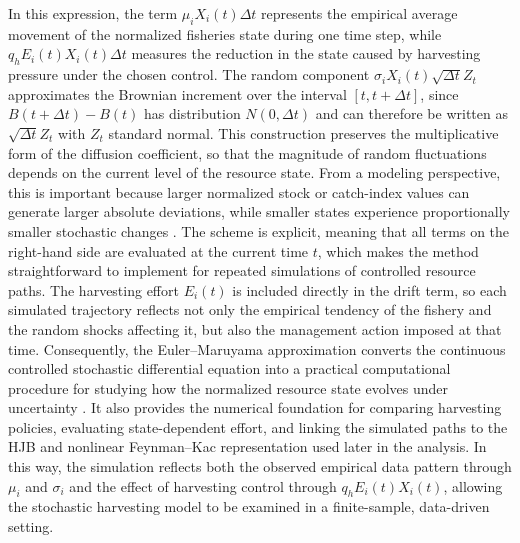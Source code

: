 \documentclass[11pt]{article}
\begin{document}
	In this expression, the term $\mu_iX_i(t)\Delta t$ represents the empirical average movement of the normalized fisheries state during one time step, while $q_hE_i(t)X_i(t)\Delta t$ measures the reduction in the state caused by harvesting pressure under the chosen control. The random component $\sigma_iX_i(t)\sqrt{\Delta t}Z_t$ approximates the Brownian increment over the interval $[t,t+\Delta t]$, since $B(t+\Delta t)-B(t)$ has distribution $N(0,\Delta t)$ and can therefore be written as $\sqrt{\Delta t}Z_t$ with $Z_t$ standard normal. This construction preserves the multiplicative form of the diffusion coefficient, so that the magnitude of random fluctuations depends on the current level of the resource state. From a modeling perspective, this is important because larger normalized stock or catch-index values can generate larger absolute deviations, while smaller states experience proportionally smaller stochastic changes \citep{khan2023myb}. The scheme is explicit, meaning that all terms on the right-hand side are evaluated at the current time $t$, which makes the method straightforward to implement for repeated simulations of controlled resource paths. The harvesting effort $E_i(t)$ is included directly in the drift term, so each simulated trajectory reflects not only the empirical tendency of the fishery and the random shocks affecting it, but also the management action imposed at that time. Consequently, the Euler--Maruyama approximation converts the continuous controlled stochastic differential equation into a practical computational procedure for studying how the normalized resource state evolves under uncertainty \citep{gaudet2011risk,anderson2026obesity}. It also provides the numerical foundation for comparing harvesting policies, evaluating state-dependent effort, and linking the simulated paths to the HJB and nonlinear Feynman--Kac representation used later in the analysis. In this way, the simulation reflects both the observed empirical data pattern through $\mu_i$ and $\sigma_i$ and the effect of harvesting control through $q_hE_i(t)X_i(t)$, allowing the stochastic harvesting model to be examined in a finite-sample, data-driven setting.
	
\end{document}
